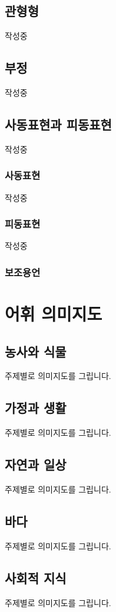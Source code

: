 \documentclass{snu-fl-questionnaire}
\begin{document}
\section{관형형}
작성중

\section{부정}
작성중

\section{사동표현과 피동표현}
작성중

\subsection{사동표현}
작성중

\subsection{피동표현}
작성중

\subsection{보조용언}

\chapter{어휘 의미지도}
\section{농사와 식물}
주제별로 의미지도를 그립니다.

\section{가정과 생활}
주제별로 의미지도를 그립니다.

\section{자연과 일상}
주제별로 의미지도를 그립니다.

\section{바다}
주제별로 의미지도를 그립니다.

\section{사회적 지식}
주제별로 의미지도를 그립니다.
\end{document}
